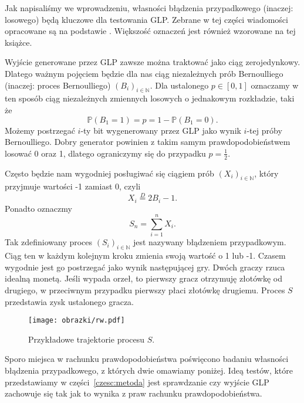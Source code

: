 \documentclass[a4paper,11pt,twoside]{book}
\newcommand{\Prob}{\mathbb{P}}
\theoremstyle{definition}
\begin{document}
Jak napisaliśmy we wprowadzeniu, własności błądzenia przypadkowego (inaczej: losowego) będą kluczowe dla testowania GLP. Zebrane w tej części wiadomości opracowane są na podstawie \cite{feller}. Większość oznaczeń jest również wzorowane na tej książce.

Wyjście generowane przez GLP zawsze można traktować jako ciąg zerojedynkowy. Dlatego ważnym pojęciem będzie dla nas ciąg niezależnych prób Bernoulliego (inaczej: proces Bernoulliego) $(B_i)_{i \in \mathbb{N}}$. Dla ustalonego $p \in [0,1]$ oznaczamy w ten sposób ciąg niezależnych zmiennych losowych o jednakowym rozkładzie, taki że
\[ \Prob(B_1 = 1) = p = 1 - \Prob(B_1 = 0). \]
Możemy postrzegać $i$-ty bit wygenerowany przez GLP jako wynik $i$-tej próby Bernoulliego. Dobry generator powinien z takim samym prawdopodobieństwem losować 0 oraz 1, dlatego ograniczymy się do przypadku $p = \frac{1}{2}$.

Często będzie nam wygodniej posługiwać się ciągiem prób $(X_i)_{i \in \mathbb{N}}$, który przyjmuje wartości -1 zamiast 0, czyli
\[ X_i \stackrel{D}{=} 2 B_i -1. \]
Ponadto oznaczmy
\[ S_n = \sum_{i=1}^{n} X_i. \]
Tak zdefiniowany proces $(S_i)_{i \in \mathbb{N}}$ jest nazywany błądzeniem przypadkowym. Ciąg ten w każdym kolejnym kroku zmienia swoją wartość o 1 lub -1. Czasem wygodnie jest go postrzegać jako wynik następującej gry. Dwóch graczy rzuca idealną monetą. Jeśli wypada orzeł, to pierwszy gracz otrzymuję złotówkę od drugiego, w przeciwnym przypadku pierwszy płaci złotówkę drugiemu. Proces $S$ przedstawia zysk ustalonego gracza.

\begin{figure}[ht]
 \centering
 \texttt{[image: obrazki/rw.pdf]}
 \caption{Przykładowe trajektorie procesu $S$.}
 \label{fig:bladzenie}
\end{figure}

Sporo miejsca w rachunku prawdopodobieństwa poświęcono badaniu własności błądzenia przypadkowego, z których dwie omawiamy poniżej. Ideą testów, które przedstawiamy w części~\ref{czesc:metoda} jest sprawdzanie czy wyjście GLP zachowuje się tak jak to wynika z praw rachunku prawdopodobieństwa.
\end{document}
